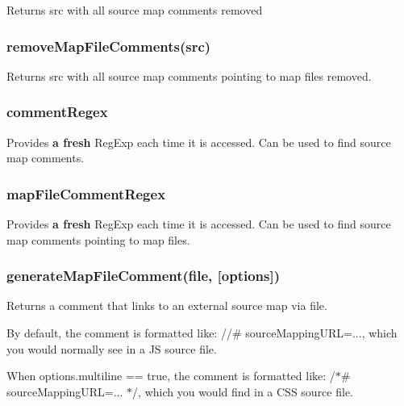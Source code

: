 Returns {\ttfamily src} with all source map comments removed

\subsubsection*{remove\+Map\+File\+Comments(src)}

Returns {\ttfamily src} with all source map comments pointing to map files removed.

\subsubsection*{comment\+Regex}

Provides {\bfseries a fresh} Reg\+Exp each time it is accessed. Can be used to find source map comments.

\subsubsection*{map\+File\+Comment\+Regex}

Provides {\bfseries a fresh} Reg\+Exp each time it is accessed. Can be used to find source map comments pointing to map files.

\subsubsection*{generate\+Map\+File\+Comment(file, \mbox{[}options\mbox{]})}

Returns a comment that links to an external source map via {\ttfamily file}.

By default, the comment is formatted like\+: {\ttfamily //\# source\+Mapping\+U\+RL=...}, which you would normally see in a JS source file.

When {\ttfamily options.\+multiline == true}, the comment is formatted like\+: {\ttfamily /$\ast$\# source\+Mapping\+U\+RL=... $\ast$/}, which you would find in a C\+SS source file.

\href{https://bitdeli.com/free}{\tt } 